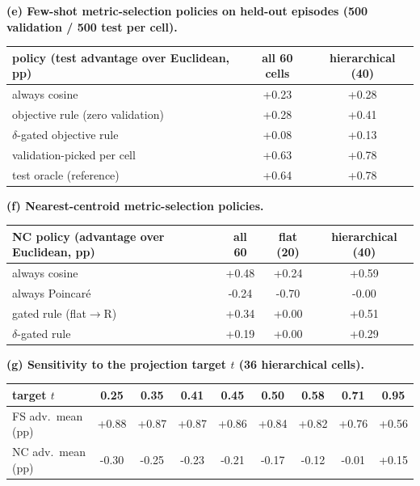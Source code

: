 \begin{table}[H]
\endgroup
\begingroup
\noindent\textbf{(e) Few-shot metric-selection policies on held-out episodes (500 validation / 500 test per cell).}\par\vspace{1.5pt}
\footnotesize
\setlength{\tabcolsep}{5pt}
\begin{tabular}{lcc}
\toprule
policy (test advantage over Euclidean, pp) & all 60 cells & hierarchical (40) \\
\midrule
always cosine & +0.23 & +0.28 \\
objective rule (zero validation) & +0.28 & +0.41 \\
$\delta$-gated objective rule & +0.08 & +0.13 \\
validation-picked per cell & +0.63 & +0.78 \\
test oracle (reference) & +0.64 & +0.78 \\
\bottomrule
\end{tabular}
\par\vspace{5pt}
\endgroup
\begingroup
\noindent\textbf{(f) Nearest-centroid metric-selection policies.}\par\vspace{1.5pt}
\footnotesize
\setlength{\tabcolsep}{5pt}
\begin{tabular}{lccc}
\toprule
NC policy (advantage over Euclidean, pp) & all 60 & flat (20) & hierarchical (40) \\
\midrule
always cosine & +0.48 & +0.24 & +0.59 \\
always Poincar\'e & -0.24 & -0.70 & -0.00 \\
gated rule (flat$\to$R) & +0.34 & +0.00 & +0.51 \\
$\delta$-gated rule & +0.19 & +0.00 & +0.29 \\
\bottomrule
\end{tabular}
\par\vspace{5pt}
\endgroup
\begingroup
\noindent\textbf{(g) Sensitivity to the projection target $t$ (36 hierarchical cells).}\par\vspace{1.5pt}
\footnotesize
\setlength{\tabcolsep}{5pt}
\begin{tabular}{lcccccccc}
\toprule
target $t$ & 0.25 & 0.35 & 0.41 & 0.45 & 0.50 & 0.58 & 0.71 & 0.95 \\
\midrule
FS adv.\ mean (pp) & +0.88 & +0.87 & +0.87 & +0.86 & +0.84 & +0.82 & +0.76 & +0.56 \\
NC adv.\ mean (pp) & -0.30 & -0.25 & -0.23 & -0.21 & -0.17 & -0.12 & -0.01 & +0.15 \\

\end{tabular}
\end{table}
